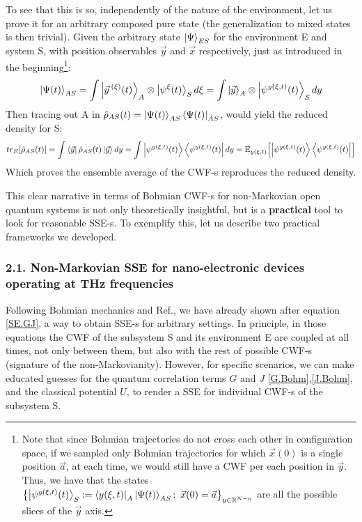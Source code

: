 \documentclass[11pt, a4paper]{article} %
\newcommand{\R}{\mathbb{R}} %
\begin{document}
To see that this is so, independently of the nature of the environment, let us prove it for an arbitrary composed pure state (the generalization to mixed states is then trivial). Given the arbitrary state $\ket{\Psi}_{ES}$ for the environment E and system S, with position observables $\vec{y}$ and $\vec{x}$ respectively, just as introduced in the beginning\footnote{Note that since Bohmian trajectories do not cross each other in configuration space, if we sampled only Bohmian trajectories for which $\vec{x}(0)$ is a single position $\vec{a}$, at each time, we would still have a CWF per each position in $\vec{y}$. Thus, we have that the states $\qty{\ket{\psi^{y(\xi,t)}(t)}_S:=\bra{y(\xi,t)}_A\ket{\Psi(t)}_{AS};\ \vec{x}(0)=\vec{a}}_{y\in\R^{N-n}}$ are all the possible slices of the $\vec{y}$ axis.}:\vspace{-0.2cm}
\begin{equation}
\ket{\Psi(t)}_{AS}=\int\ket{\vec{y}^{\:(\xi)}(t)}_A\otimes \ket{\psi^\xi(t)}_S d\xi = \int\ket{\vec{y}}_A\otimes \ket{\psi^{y(\xi,t)}(t)}_S dy
\end{equation}
Then tracing out A in $\hat{\rho}_{AS}(t)=\ket{\Psi(t)}_{AS}\bra{\Psi(t)}_{AS}$, would yield the reduced density for S:
\begin{equation}
tr_E\qty[\hat{\rho}_{AS}(t)] = \int\bra{\vec{y}}\hat{\rho}_{AS}(t)\ket{\vec{y}}dy = \int \ket{\psi^{y(\xi,t)}(t)}\bra{\psi^{y(\xi,t)}(t)} dy = \mathbb{E}_{y(\xi,t)}\qty[\ket{\psi^{y(\xi,t)}(t)}\bra{\psi^{y(\xi,t)}(t)}]
\end{equation}
Which proves the ensemble average of the CWF-s reproduces the reduced density.

This clear narrative in terms of Bohmian CWF-s for non-Markovian open quantum systems is not only theoretically insightful, but is a {\bf practical} tool to look for reasonable SSE-s. To exemplify this, let us describe two practical frameworks we developed.

\subsubsection*{2.1. Non-Markovian SSE for nano-electronic devices operating at THz frequencies}
Following Bohmian mechanics and Ref.\cite{GJ}, we have already shown after equation \eqref{SE.GJ}, a way to obtain SSE-s for arbitrary settings. In principle, in those equations the CWF of the subsystem S and its environment E are coupled at all times, not only between them, but also with the rest of possible CWF-s (signature of the non-Markovianity). However, for specific scenarios, we can make educated guesses for the quantum correlation terms $G$ and $J$ \eqref{G.Bohm},\eqref{J.Bohm}, and the classical potential $U$, to render a SSE for individual CWF-s of the subsystem S.
\end{document}
